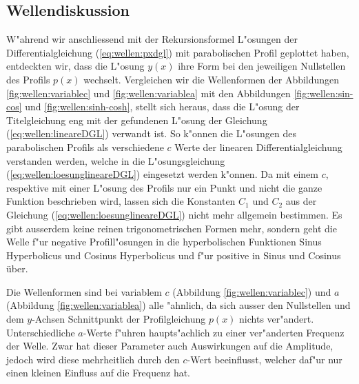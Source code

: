 \subsection{Wellendiskussion}
\label{sec:wellen:diskussionwellenform}
W"ahrend wir anschliessend mit der Rekursionsformel L"osungen der 
Differentialgleichung (\ref{eq:wellen:pxdgl}) mit parabolischen Profil
geplottet haben, entdeckten wir, dass die L"osung $y(x)$ ihre Form 
bei den jeweiligen Nullstellen des Profils $p(x)$ wechselt.
Vergleichen wir die Wellenformen der Abbildungen \ref{fig:wellen:variablec} und 
\ref{fig:wellen:variablea} mit den Abbildungen \ref{fig:wellen:sin-cos} und 
\ref{fig:wellen:sinh-cosh}, stellt sich heraus, dass die L"osung der 
Titelgleichung eng mit der gefundenen L"osung der Gleichung 
(\ref{eq:wellen:lineareDGL}) verwandt ist. So k"onnen die L"osungen des 
parabolischen Profils als verschiedene $c$ Werte der linearen 
Differentialgleichung verstanden werden, welche in die L"osungsgleichung 
(\ref{eq:wellen:loesunglineareDGL}) eingesetzt werden k"onnen. 
Da mit einem $c$, respektive mit einer L"osung des Profils nur ein Punkt 
und nicht die ganze Funktion beschrieben wird, lassen sich die Konstanten $C_1$ 
und $C_2$ aus der Gleichung (\ref{eq:wellen:loesunglineareDGL}) nicht mehr 
allgemein bestimmen. Es gibt ausserdem keine reinen trigonometrischen Formen 
mehr, sondern geht die Welle f"ur negative Profill"osungen in die 
hyperbolischen Funktionen Sinus Hyperbolicus und Cosinus Hyperbolicus und f"ur 
positive in Sinus und Cosinus über.

Die Wellenformen sind bei variablem $c$ (Abbildung \ref{fig:wellen:variablec}) 
und $a$ (Abbildung \ref{fig:wellen:variablea}) alle "ahnlich, da sich ausser 
den Nullstellen und dem $y$-Achsen Schnittpunkt der Profilgleichung $p(x)$ 
nichts ver"andert. Unterschiedliche $a$-Werte f"uhren haupts"achlich zu einer 
ver"anderten Frequenz der Welle. Zwar hat dieser Parameter auch Auswirkungen 
auf die Amplitude, jedoch wird diese mehrheitlich durch den $c$-Wert 
beeinflusst, welcher daf"ur nur einen kleinen Einfluss auf die Frequenz hat.

